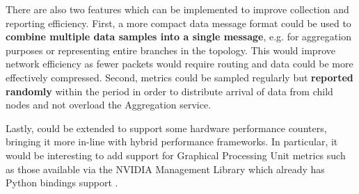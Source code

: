 There are also two features which can be implemented to improve collection and reporting efficiency. First, a more
compact data message format could be used to \textbf{combine multiple data samples into a single message}, e.g. for
aggregation purposes or representing entire branches in the topology. This would improve network efficiency as fewer
packets would require routing and data could be more effectively compressed. Second, metrics could be sampled regularly
but \textbf{reported randomly} within the period in order to distribute arrival of data from child nodes and not
overload the Aggregation service.

Lastly, \dcamp could be extended to support some hardware performance counters, bringing it more in-line with hybrid
performance frameworks. In particular, it would be interesting to add support for Graphical Processing Unit metrics such
as those available via the NVIDIA Management Library\cite{nvidiaML} which already has Python bindings support
\cite{py-nvidia}.
